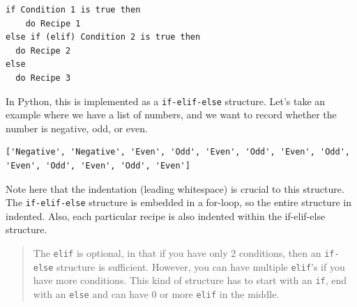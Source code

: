 \documentclass[
  letterpaper,
]{scrbook}
\newenvironment{Shaded}{\begin{snugshade}}{\end{snugshade}}
\newcommand{\BuiltInTok}[1]{#1}
\newcommand{\CommentTok}[1]{\textcolor[rgb]{0.56,0.35,0.01}{\textit{#1}}}
\newcommand{\ControlFlowTok}[1]{\textcolor[rgb]{0.13,0.29,0.53}{\textbf{#1}}}
\newcommand{\DecValTok}[1]{\textcolor[rgb]{0.00,0.00,0.81}{#1}}
\newcommand{\KeywordTok}[1]{\textcolor[rgb]{0.13,0.29,0.53}{\textbf{#1}}}
\newcommand{\NormalTok}[1]{#1}
\newcommand{\OperatorTok}[1]{\textcolor[rgb]{0.81,0.36,0.00}{\textbf{#1}}}
\newcommand{\StringTok}[1]{\textcolor[rgb]{0.31,0.60,0.02}{#1}}
\begin{document}
\begin{verbatim}
if Condition 1 is true then
    do Recipe 1
else if (elif) Condition 2 is true then
  do Recipe 2
else
  do Recipe 3
\end{verbatim}

In Python, this is implemented as a \texttt{if-elif-else} structure. Let's take an example where we have a list of numbers, and we want to record whether the number is negative, odd, or even.

\begin{Shaded}
\end{Shaded}

\begin{verbatim}
['Negative', 'Negative', 'Even', 'Odd', 'Even', 'Odd', 'Even', 'Odd', 'Even', 'Odd', 'Even', 'Odd', 'Even']
\end{verbatim}

Note here that the indentation (leading whitespace) is crucial to this structure. The \texttt{if-elif-else} structure is embedded in a for-loop, so the entire structure in indented. Also, each particular recipe is also indented within the if-elif-else structure.

\begin{quote}
The \texttt{elif} is optional, in that if you have only 2 conditions, then an \texttt{if-else} structure is sufficient. However, you can have multiple \texttt{elif}'s if you have more conditions. This kind of structure has to start with an \texttt{if}, end with an \texttt{else} and can have 0 or more \texttt{elif} in the middle.
\end{quote}
\end{document}
